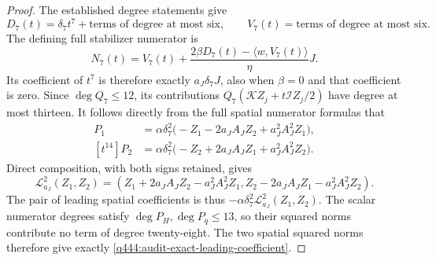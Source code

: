 \begin{proof}
The established degree statements give
\[
 D_7(t)=\delta_7t^7+\text{terms of degree at most six},\qquad
 V_7(t)=\text{terms of degree at most six}.
\]
The defining full stabilizer numerator is
\[
 N_7(t)=V_7(t)+
    \frac{2\beta D_7(t)-\langle w,V_7(t)\rangle}{\eta}J.
\]
Its coefficient of $t^7$ is therefore exactly $a_J\delta_7J$,
also when $\beta=0$ and that coefficient is zero. Since
$\deg Q_7\le12$, its contributions
$Q_7(\mathcal KZ_j+t\mathcal IZ_j/2)$ have degree at most thirteen.
It follows directly from the full spatial numerator formulas that
\begin{align*}
 [t^{14}]P_1
 &=\alpha\delta_7^2
       \bigl(-Z_1-2a_J A_JZ_2+a_J^2A_J^2Z_1\bigr),\\
 [t^{14}]P_2
 &=\alpha\delta_7^2
       \bigl(-Z_2+2a_J A_JZ_1+a_J^2A_J^2Z_2\bigr).
\end{align*}
Direct composition, with both signs retained, gives
\[
 \mathcal L_{a_J}^2(Z_1,Z_2)
 =(Z_1+2a_J A_JZ_2-a_J^2A_J^2Z_1,
   Z_2-2a_J A_JZ_1-a_J^2A_J^2Z_2).
\]
The pair of leading spatial coefficients is thus
$-\alpha\delta_7^2\mathcal L_{a_J}^2(Z_1,Z_2)$.
The scalar numerator degrees satisfy $\deg P_H,\deg P_q\le13$,
so their squared norms contribute no term of degree twenty-eight.
The two spatial squared norms therefore give exactly
\eqref{q444:audit-exact-leading-coefficient}.


\end{proof}
